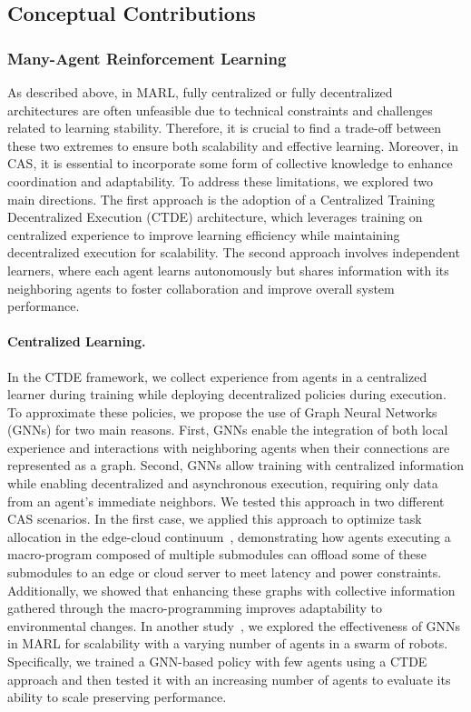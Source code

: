 \documentclass[12pt]{article}
\begin{document}
\subsection{Conceptual Contributions}

\subsubsection{Many-Agent Reinforcement Learning}

As described above, in MARL, fully centralized or fully decentralized architectures are often 
 unfeasible due to technical constraints and challenges related to learning stability. 
% 
Therefore, it is crucial to find a trade-off between these two extremes to ensure both scalability and 
 effective learning. 
% 
Moreover, in CAS, it is essential to incorporate some form of collective knowledge to enhance 
 coordination and adaptability.
% 
To address these limitations, we explored two main directions. 
%
The first approach is the adoption of a Centralized Training Decentralized Execution (CTDE) architecture, 
 which leverages training on centralized experience to improve learning efficiency while maintaining 
 decentralized execution for scalability. 
% 
The second approach involves independent learners, where each agent learns autonomously but shares information with 
 its neighboring agents to foster collaboration and improve overall system performance.

\paragraph{Centralized Learning.}
In the CTDE framework, we collect experience from agents in a centralized 
 learner during training while deploying decentralized policies during execution. 
% 
To approximate these policies, we propose the use of Graph Neural Networks (GNNs) for two main reasons. 
%
First, GNNs enable the integration of both local experience and interactions with neighboring agents 
 when their connections are represented as a graph. 
% 
Second, GNNs allow training with centralized information while enabling decentralized and asynchronous execution, 
 requiring only data from an agent's immediate neighbors. 
% 
We tested this approach in two different CAS scenarios. 
%
In the first case, we applied this approach to optimize task allocation in the 
 edge-cloud continuum~\cite{DBLP:journals/taas/FarabegoliDAV2025,DBLP:conf/woa/DominiFAV24}, 
 demonstrating how agents executing a macro-program composed of multiple submodules can offload some of these submodules 
 to an edge or cloud server to meet latency and power constraints. 
%
Additionally, we showed that enhancing these graphs with collective information gathered through the macro-programming 
 improves adaptability to environmental changes. 
% 
In another study~\cite{DBLP:conf/coordination/VenturiniDAV2025}, we explored the effectiveness of GNNs in MARL for 
 scalability with a varying number of agents in a swarm of robots. 
% 
Specifically, we trained a GNN-based policy with few agents using a CTDE approach and then tested it 
 with an increasing number of agents to evaluate its ability to scale preserving performance.
\end{document}
